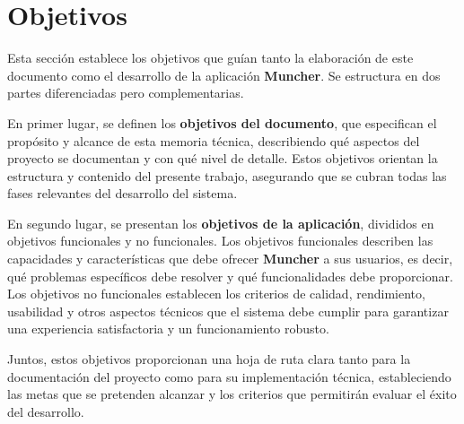 \section*{Objetivos}

Esta sección establece los objetivos que guían tanto la elaboración de este documento como el desarrollo de la aplicación \textbf{Muncher}. Se estructura en dos partes diferenciadas pero complementarias.

En primer lugar, se definen los \textbf{objetivos del documento}, que especifican el propósito y alcance de esta memoria técnica, describiendo qué aspectos del proyecto se documentan y con qué nivel de detalle. Estos objetivos orientan la estructura y contenido del presente trabajo, asegurando que se cubran todas las fases relevantes del desarrollo del sistema.

En segundo lugar, se presentan los \textbf{objetivos de la aplicación}, divididos en objetivos funcionales y no funcionales. Los objetivos funcionales describen las capacidades y características que debe ofrecer \textbf{Muncher} a sus usuarios, es decir, qué problemas específicos debe resolver y qué funcionalidades debe proporcionar. Los objetivos no funcionales establecen los criterios de calidad, rendimiento, usabilidad y otros aspectos técnicos que el sistema debe cumplir para garantizar una experiencia satisfactoria y un funcionamiento robusto.

Juntos, estos objetivos proporcionan una hoja de ruta clara tanto para la documentación del proyecto como para su implementación técnica, estableciendo las metas que se pretenden alcanzar y los criterios que permitirán evaluar el éxito del desarrollo.